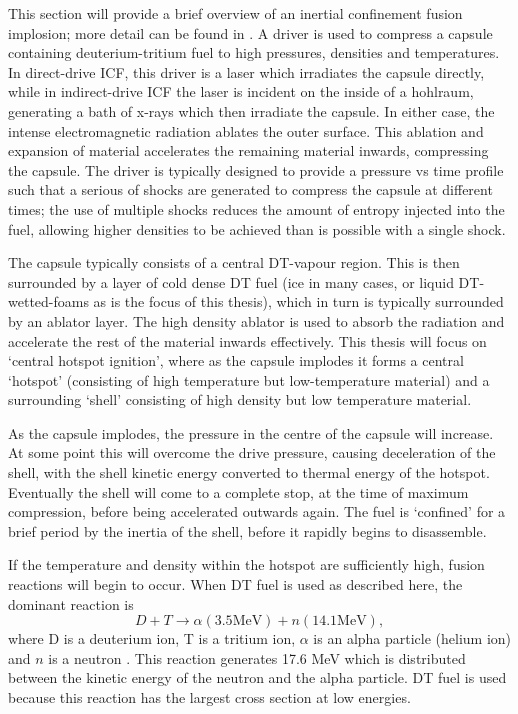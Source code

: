 This section will provide a brief overview of an inertial confinement fusion implosion; more detail can be found in \cite{Atzeni2008}. A driver is used to compress a capsule containing deuterium-tritium fuel to high pressures, densities and temperatures. In direct-drive ICF, this driver is a laser which irradiates the capsule directly, while in indirect-drive ICF the laser is incident on the inside of a hohlraum, generating a bath of x-rays which then irradiate the capsule. In either case, the intense electromagnetic radiation ablates the outer surface. This ablation and expansion of material accelerates the remaining material inwards, compressing the capsule. The driver is typically designed to provide a pressure vs time profile such that a serious of shocks are generated to compress the capsule at different times; the use of multiple shocks reduces the amount of entropy injected into the fuel, allowing higher densities to be achieved than is possible with a single shock.

The capsule typically consists of a central DT-vapour region. This is then surrounded by a layer of cold dense DT fuel (ice in many cases, or liquid DT-wetted-foams as is the focus of this thesis), which in turn is typically surrounded by an ablator layer. The high density ablator is used to absorb the radiation and accelerate the rest of the material inwards effectively. This thesis will focus on `central hotspot ignition', where as the capsule implodes it forms a central `hotspot' (consisting of high temperature but low-temperature material) and a surrounding `shell' consisting of high density but low temperature material.

As the capsule implodes, the pressure in the centre of the capsule will increase. At some point this will overcome the drive pressure, causing deceleration of the shell, with the shell kinetic energy converted to thermal energy of the hotspot. Eventually the shell will come to a complete stop, at the time of maximum compression, before being accelerated outwards again. The fuel is `confined' for a brief period by the inertia of the shell, before it rapidly begins to disassemble.

If the temperature and density within the hotspot are sufficiently high, fusion reactions will begin to occur. When DT fuel is used as described here, the dominant reaction is 
\begin{equation} D + T \rightarrow \alpha(3.5 \text{MeV}) + n(14.1 \text{MeV}), \end{equation}
where D is a deuterium ion, T is a tritium ion, $\alpha$ is an alpha particle (helium ion) and $n$ is a neutron \cite{Atzeni2008}. This reaction generates 17.6 MeV which is distributed between the kinetic energy of the neutron and the alpha particle. DT fuel is used because this reaction has the largest cross section at low energies.


